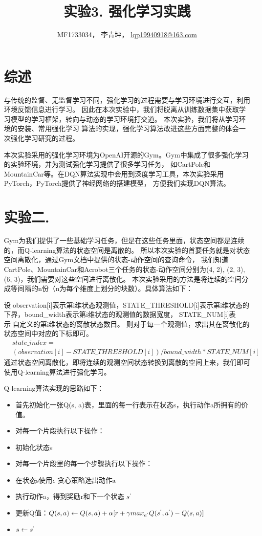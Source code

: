 \documentclass[a4paper,UTF8]{article}
\theoremstyle{definition}
\begin{document}
\title{实验3. 强化学习实践}
\author{MF1733034， 李青坪， \url{lqp19940918@163.com}}
\maketitle

\section*{综述}
与传统的监督、无监督学习不同，强化学习的过程需要与学习环境进行交互，利用环境反馈信息进行学习。
因此在本次实验中，我们将脱离从训练数据集中获取学习模型的学习框架，转向与动态的学习环境打交道。
本次实验，我们将从学习环境的安装、常用强化学习 算法的实现，强化学习算法改进这些方面完整的体会一次强化学习研究的过程。

本次实验采用的强化学习环境为OpenAI开源的Gym。Gym中集成了很多强化学习的实验环境，并为测试强化学习提供了很多学习任务，
如CartPole和MountainCar等。在DQN算法实现中会用到深度学习工具，本次实验采用PyTorch，PyTorch提供了神经网络的搭建模型，
方便我们实现DQN算法。

\section*{实验二. }
Gym为我们提供了一些基础学习任务，但是在这些任务里面，状态空间都是连续的，而Q-learning算法的状态空间是离散的。
所以本次实验的首要任务就是对状态空间离散化，通过Gym文档中提供的状态-动作空间的查询命令，
我们知道CartPole、MountainCar和Acrobot三个任务的状态-动作空间分别为(4, 2), (2, 3), (6, 3)，我们需要对这些空间进行离散化。
本次实验采用的方法是将连续的空间分成等间隔的n份（n为每个维度上划分的块数）。具体算法如下：

设observation[i]表示第i维状态观测值，STATE\_THRESHOLD[i]表示第i维状态的下界，bound\_width表示第i维状态的观测值的数据宽度，
STATE\_NUM[i]表示自定义的第i维状态的离散状态数目。
则对于每一个观测值，求出其在离散化的状态空间中对应的下标即可。
\begin{align*}
	&state\_index = \\
	&(observation[i] - STATE\_THRESHOLD[i])/bound\_width * STATE\_NUM[i]
\end{align*}
通过状态空间离散化，即将连续的观测空间状态转换到离散的空间上来，我们即可使用Q-learning算法进行强化学习。

Q-learning算法实现的思路如下：
\begin{itemize}
	\item 首先初始化一张Q(s, a)表，里面的每一行表示在状态s，执行动作a所拥有的价值。
	\item 对每一个片段执行以下操作：
	\item 初始化状态s
	\item 对每一个片段里的每一个步骤执行以下操作：
	\item 在状态s使用$\epsilon$ 贪心策略选出动作a
	\item 执行动作a，得到奖励r和下一个状态$s^`$
	\item 更新Q值：$Q(s, a) \gets Q(s, a) + \alpha [r + \gamma max_{a^`}Q(s^`, a^`) - Q(s, a)]$
	\item $s \gets s^`$
\end{itemize}
\end{document}
